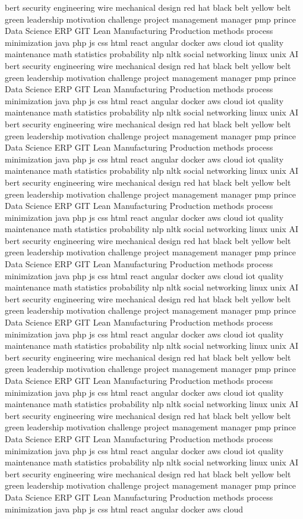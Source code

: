 \documentclass[letterpaper,11pt]{article}
\begin{document}
bert security engineering wire mechanical design red hat black belt yellow belt green leadership motivation challenge project management manager pmp prince Data Science ERP GIT Lean Manufacturing Production methods process minimization java php js css html react angular docker aws cloud iot quality maintenance math statistics probability nlp nltk social networking linux unix AI bert security engineering wire mechanical design red hat black belt yellow belt green leadership motivation challenge project management manager pmp prince Data Science ERP GIT Lean Manufacturing Production methods process minimization java php js css html react angular docker aws cloud iot quality maintenance math statistics probability nlp nltk social networking linux unix AI bert security engineering wire mechanical design red hat black belt yellow belt green leadership motivation challenge project management manager pmp prince Data Science ERP GIT Lean Manufacturing Production methods process minimization java php js css html react angular docker aws cloud iot quality maintenance math statistics probability nlp nltk social networking linux unix AI bert security engineering wire mechanical design red hat black belt yellow belt green leadership motivation challenge project management manager pmp prince Data Science ERP GIT Lean Manufacturing Production methods process minimization java php js css html react angular docker aws cloud iot quality maintenance math statistics probability nlp nltk social networking linux unix AI bert security engineering wire mechanical design red hat black belt yellow belt green leadership motivation challenge project management manager pmp prince Data Science ERP GIT Lean Manufacturing Production methods process minimization java php js css html react angular docker aws cloud iot quality maintenance math statistics probability nlp nltk social networking linux unix AI bert security engineering wire mechanical design red hat black belt yellow belt green leadership motivation challenge project management manager pmp prince Data Science ERP GIT Lean Manufacturing Production methods process minimization java php js css html react angular docker aws cloud iot quality maintenance math statistics probability nlp nltk social networking linux unix AI bert security engineering wire mechanical design red hat black belt yellow belt green leadership motivation challenge project management manager pmp prince Data Science ERP GIT Lean Manufacturing Production methods process minimization java php js css html react angular docker aws cloud iot quality maintenance math statistics probability nlp nltk social networking linux unix AI bert security engineering wire mechanical design red hat black belt yellow belt green leadership motivation challenge project management manager pmp prince Data Science ERP GIT Lean Manufacturing Production methods process minimization java php js css html react angular docker aws cloud iot quality maintenance math statistics probability nlp nltk social networking linux unix AI bert security engineering wire mechanical design red hat black belt yellow belt green leadership motivation challenge project management manager pmp prince Data Science ERP GIT Lean Manufacturing Production methods process minimization java php js css html react angular docker aws cloud 
\end{document}
